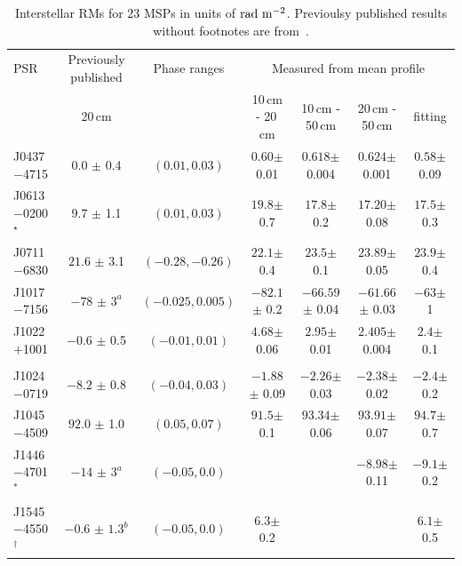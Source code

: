 \documentclass[useAMS,usenatbib]{mn2e}
\begin{document}
\begin{table}
\centering
\caption{Interstellar RMs for $23$ MSPs in units of $\rm{rad\ m^{-2}}$. Previoulsy published results without footnotes are from~\citet{Yan11}.}
\label{rm}
\begin{tabular}{lcccccc}
\hline
PSR          &    Previously published &  Phase ranges        &    \multicolumn{4}{c}{Measured from mean profile}                   \\  
             &    20\,cm               &                      &    10\,cm - 20\,cm  &  10\,cm - 50\,cm   &  20\,cm - 50\,cm   &    fitting      \\   
\hline
J0437$-$4715            & $0.0   $ $\pm$ 0.4      &  $(0.01, 0.03)   $ & $0.60   $$\pm$ 0.01  & $0.618   $$\pm$ 0.004 &  $0.624   $$\pm$ 0.001 &  $0.58   $$\pm$ 0.09   \\  
J0613$-$0200$^\star$    & $9.7   $ $\pm$ 1.1      &  $(0.01, 0.03)   $ & $19.8   $$\pm$ 0.7   & $17.8    $$\pm$ 0.2   &  $17.20   $$\pm$ 0.08  &  $17.5   $$\pm$ 0.3   \\  
J0711$-$6830            & $21.6  $ $\pm$ 3.1      &  $(-0.28, -0.26) $ & $22.1   $$\pm$ 0.4   & $23.5    $$\pm$ 0.1   &  $23.89   $$\pm$ 0.05  &  $23.9   $$\pm$ 0.4   \\  
J1017$-$7156            & $-78   $ $\pm$ $3^a$    &  $(-0.025, 0.005)$ & $-82.1  $$\pm$ 0.2   & $-66.59  $$\pm$ 0.04  &  $-61.66  $$\pm$ 0.03  &  $-63    $$\pm$ 1    \\
J1022$+$1001            & $-0.6  $ $\pm$ 0.5      &  $(-0.01, 0.01)  $ & $4.68   $$\pm$ 0.06  & $2.95    $$\pm$ 0.01  &  $2.405   $$\pm$ 0.004 &  $2.4    $$\pm$ 0.1   \\  
                        &                         &                    &                      &                       &                        &                       \\
J1024$-$0719            & $-8.2  $ $\pm$ 0.8      &  $(-0.04, 0.03)  $ & $-1.88  $$\pm$ 0.09  & $-2.26   $$\pm$ 0.03  &  $-2.38   $$\pm$ 0.02  &  $-2.4   $$\pm$ 0.2    \\  
J1045$-$4509            & $92.0  $ $\pm$ 1.0      &  $(0.05, 0.07)   $ & $91.5   $$\pm$ 0.1   & $93.34   $$\pm$ 0.06  &  $93.91   $$\pm$ 0.07  &  $94.7   $$\pm$ 0.7    \\  
J1446$-$4701$^\ast$     & $-14   $ $\pm$ $3^a$    &  $(-0.05, 0.0)   $ &                      &                       &  $-8.98   $$\pm$ 0.11  &  $-9.1   $$\pm$ 0.2    \\
J1545$-$4550$^\dagger$  & $-0.6  $ $\pm$ $1.3^b$  &  $(-0.05, 0.0)   $ & $6.3    $$\pm$ 0.2   &                       &                        &  $6.1    $$\pm$ 0.5    \\

\end{tabular}
\end{table}
\end{document}
